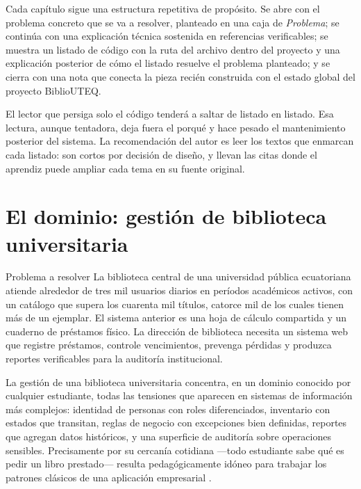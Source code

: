 Cada cap\'itulo sigue una estructura repetitiva de prop\'osito. Se abre con el problema concreto que se va a resolver, planteado en una caja de \textit{Problema}; se contin\'ua con una explicaci\'on t\'ecnica sostenida en referencias verificables; se muestra un listado de c\'odigo con la ruta del archivo dentro del proyecto y una explicaci\'on posterior de c\'omo el listado resuelve el problema planteado; y se cierra con una nota que conecta la pieza reci\'en construida con el estado global del proyecto BiblioUTEQ.

El lector que persiga solo el c\'odigo tender\'a a saltar de listado en listado. Esa lectura, aunque tentadora, deja fuera el porqu\'e y hace pesado el mantenimiento posterior del sistema. La recomendaci\'on del autor es leer los textos que enmarcan cada listado: son cortos por decisi\'on de dise\~no, y llevan las citas donde el aprendiz puede ampliar cada tema en su fuente original.

\section{El dominio: gesti\'on de biblioteca universitaria}
\label{sec:u0:dominio}

\begin{cajaproblema}{Problema a resolver}
La biblioteca central de una universidad p\'ublica ecuatoriana atiende alrededor de tres mil usuarios diarios en per\'iodos acad\'emicos activos, con un cat\'alogo que supera los cuarenta mil t\'itulos, catorce mil de los cuales tienen m\'as de un ejemplar. El sistema anterior es una hoja de c\'alculo compartida y un cuaderno de pr\'estamos f\'isico. La direcci\'on de biblioteca necesita un sistema web que registre pr\'estamos, controle vencimientos, prevenga p\'erdidas y produzca reportes verificables para la auditor\'ia institucional.\par
\end{cajaproblema}

La gesti\'on de una biblioteca universitaria concentra, en un dominio conocido por cualquier estudiante, todas las tensiones que aparecen en sistemas de informaci\'on m\'as complejos: identidad de personas con roles diferenciados, inventario con estados que transitan, reglas de negocio con excepciones bien definidas, reportes que agregan datos hist\'oricos, y una superficie de auditor\'ia sobre operaciones sensibles. Precisamente por su cercan\'ia cotidiana ---todo estudiante sabe qu\'e es pedir un libro prestado--- resulta pedag\'ogicamente id\'oneo para trabajar los patrones cl\'asicos de una aplicaci\'on empresarial \cite{martin2017clean,bass2021software}.

